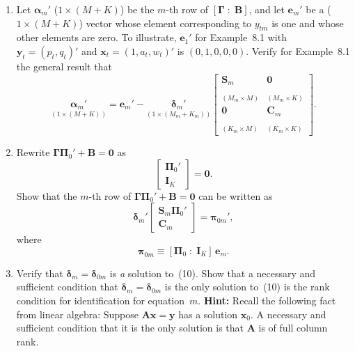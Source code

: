 \begin{problemset}
\begin{enumerate}[label=(\alph*)]
\item Let $\boldsymbol{\alpha}_m'$ ($1 \times (M + K)$) be the $m$-th row of $[\boldsymbol{\Gamma} \;:\; \mathbf{B}]$, and let $\mathbf{e}_m'$ be a ($1 \times (M +
  K)$) vector whose element corresponding to $y_{tm}$ is one and whose other
  elements are zero. To illustrate, $\mathbf{e}_1'$ for Example~8.1 with
  $\mathbf{y}_t = (p_t, q_t)'$ and
  $\mathbf{x}_t = (1, a_t, w_t)'$ is $(0, 1, 0, 0, 0)$. Verify for Example~8.1 the general result
  that
  \begin{equation}
    \underset{(1 \times (M+K))}{\boldsymbol{\alpha}_m'}
    = \mathbf{e}_m'
    - \underset{(1 \times (M_m + K_m))}{\boldsymbol{\delta}_m'}
    \begin{bmatrix}
      \mathbf{S}_m & \mathbf{0} \\
      \underset{(M_m \times M)}{\phantom{x}} & \underset{(M_m \times K)}{\phantom{x}} \\
      \mathbf{0} & \mathbf{C}_m \\
      \underset{(K_m \times M)}{\phantom{x}} & \underset{(K_m \times K)}{\phantom{x}}
    \end{bmatrix}.
    \tag{8}
  \end{equation}

\item Rewrite $\boldsymbol{\Gamma}\boldsymbol{\Pi}_0' + \mathbf{B} = \mathbf{0}$ as
  \begin{equation}
    [\boldsymbol{\Gamma} \;:\; \mathbf{B}]
    \begin{bmatrix} \boldsymbol{\Pi}_0' \\ \mathbf{I}_K \end{bmatrix} = \mathbf{0}.
    \tag{9}
  \end{equation}
  Show that the $m$-th row of $\boldsymbol{\Gamma}\boldsymbol{\Pi}_0' + \mathbf{B} = \mathbf{0}$ can be written as
  \begin{equation}
    \boldsymbol{\delta}_m'
    \begin{bmatrix} \mathbf{S}_m\boldsymbol{\Pi}_0' \\ \mathbf{C}_m \end{bmatrix}
    = \boldsymbol{\pi}_{0m}',
    \tag{10}
  \end{equation}
  where
  \begin{equation}
    \boldsymbol{\pi}_{0m} \equiv [\boldsymbol{\Pi}_0 \;:\; \mathbf{I}_K]\,\mathbf{e}_m.
    \tag{11}
  \end{equation}

\item Verify that $\boldsymbol{\delta}_m = \boldsymbol{\delta}_{0m}$ is \emph{a} solution to~(10). Show that a necessary and
  sufficient condition that $\boldsymbol{\delta}_m = \boldsymbol{\delta}_{0m}$ is the only solution to~(10) is the rank
  condition for identification for equation~$m$.
  \textbf{Hint:} Recall the following fact
  from linear algebra: Suppose $\mathbf{A}\mathbf{x} = \mathbf{y}$ has a solution $\mathbf{x}_0$. A necessary and
  sufficient condition that it is the only solution is that $\mathbf{A}$ is of full column rank.


\end{enumerate}
\end{problemset}
